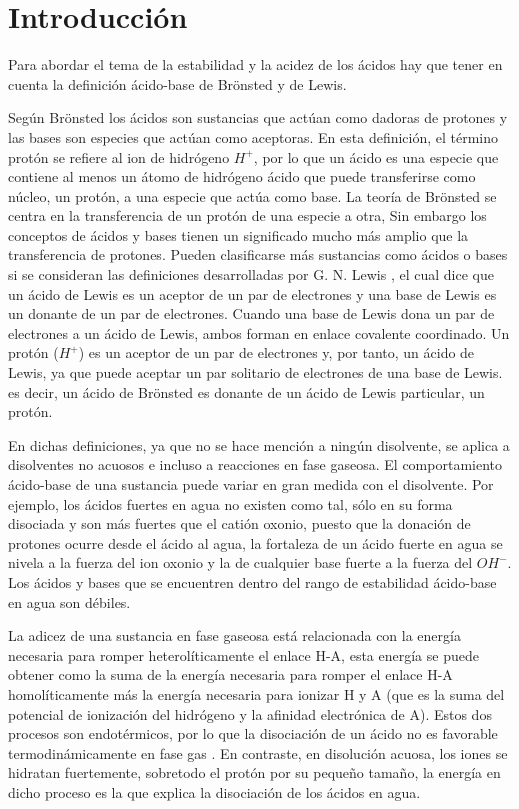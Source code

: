 \chapter{Introducción}

Para abordar el tema de la estabilidad y la acidez de los ácidos hay que tener en cuenta la definición ácido-base de Brönsted y de Lewis. \cite{quimica1}

Según Brönsted  \cite{quimica7} los ácidos son sustancias que actúan como dadoras de protones y las bases son especies que actúan como aceptoras. En esta definición, el término protón se refiere al ion de hidrógeno $H^+$, por lo que un ácido es una especie que contiene al menos un átomo de hidrógeno ácido que puede transferirse como núcleo, un protón, a una especie que actúa como base. La teoría de Brönsted se centra en la transferencia de un protón de una especie a otra, Sin embargo los conceptos de ácidos y bases tienen un significado mucho más amplio que la transferencia de protones. Pueden clasificarse más sustancias como ácidos o bases si se consideran las definiciones desarrolladas por G. N. Lewis \cite{quimica7}, el cual dice que un ácido de Lewis es un aceptor de un par de electrones y una base de Lewis es un donante de un par de electrones. Cuando una base de Lewis dona un par de electrones a un ácido de Lewis, ambos forman en enlace covalente coordinado. Un protón ($H^+$) es un aceptor de un par de electrones y, por tanto, un ácido de Lewis, ya que puede aceptar un par solitario de electrones de una base de Lewis. es decir, un ácido de Brönsted es donante de un ácido de Lewis particular, un protón.

En dichas definiciones, ya que no se hace mención a ningún disolvente, se aplica a disolventes no acuosos e incluso a reacciones en fase gaseosa. El comportamiento ácido-base de una sustancia puede variar en gran medida con el disolvente. Por ejemplo, los ácidos fuertes en agua no existen como tal, sólo en su forma disociada y son más fuertes que el catión oxonio, puesto que la donación de protones ocurre desde el ácido al agua, la fortaleza de un ácido fuerte en agua se nivela a la fuerza del ion oxonio y la de cualquier base fuerte a la fuerza del $OH ^-$. Los ácidos y bases que se encuentren dentro del rango de estabilidad ácido-base en agua son débiles.

La adicez de una sustancia en fase gaseosa está relacionada con la energía necesaria para romper heterolíticamente el enlace H-A, esta energía se puede obtener como la suma de la energía necesaria para romper el enlace H-A homolíticamente más la energía necesaria para ionizar H y A (que es la suma del potencial de ionización del hidrógeno y la afinidad electrónica de A). Estos dos procesos son endotérmicos, por lo que la disociación de un ácido no es favorable termodinámicamente en fase gas \cite {quimica1}. En contraste, en disolución acuosa, los iones se hidratan fuertemente, sobretodo el protón por su pequeño tamaño, la energía en dicho proceso es la que explica la disociación de los ácidos en agua.

